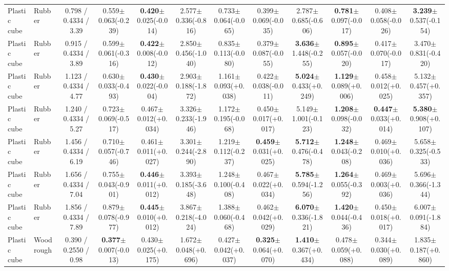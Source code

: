 \begin{table}[t]
{\begin{tabular}{l l c c c c c c c c c c }
        Plastic cube & Rubber & 0.798 / 0.4334 / 3.39 & 0.559$\pm$0.063(-0.239) & \textbf{0.420}$\pm$0.025(-0.014) & 2.577$\pm$0.336(-0.816) & 0.733$\pm$0.064(-0.065) & 0.399$\pm$0.069(-0.035) & 2.787$\pm$0.685(-0.606) & \textbf{0.781}$\pm$0.097(-0.017) & 0.408$\pm$0.058(-0.026) & \textbf{3.239}$\pm$0.537(-0.154) \\
        Plastic cube & Rubber & 0.915 / 0.4334 / 3.89 & 0.599$\pm$0.061(-0.316) & \textbf{0.422}$\pm$0.008(-0.012) & 2.850$\pm$0.456(-1.040) & 0.835$\pm$0.113(-0.080) & 0.379$\pm$0.087(-0.055) & \textbf{3.636}$\pm$1.448(-0.255) & \textbf{0.895}$\pm$0.057(-0.020) & 0.417$\pm$0.070(-0.017) & 3.470$\pm$0.831(-0.420) \\
        Plastic cube & Rubber & 1.123 / 0.4334 / 4.77 & 0.630$\pm$0.033(-0.493) & \textbf{0.430}$\pm$0.022(-0.004) & 2.903$\pm$0.188(-1.872) & 1.161$\pm$0.093(+0.038) & 0.422$\pm$0.038(-0.011) & \textbf{5.024}$\pm$0.433(+0.249) & \textbf{1.129}$\pm$0.089(+0.006) & 0.458$\pm$0.012(+0.025) & 5.132$\pm$0.457(+0.357) \\
        Plastic cube & Rubber & 1.240 / 0.4334 / 5.27 & 0.723$\pm$0.069(-0.517) & 0.467$\pm$0.012(+0.034) & 3.326$\pm$0.233(-1.946) & 1.172$\pm$0.195(-0.068) & 0.450$\pm$0.017(+0.017) & 5.149$\pm$1.001(-0.123) & \textbf{1.208}$\pm$0.098(-0.032) & \textbf{0.447}$\pm$0.033(+0.014) & \textbf{5.380}$\pm$0.908(+0.107) \\
        Plastic cube & Rubber & 1.456 / 0.4334 / 6.19 & 0.710$\pm$0.057(-0.746) & 0.461$\pm$0.011(+0.027) & 3.301$\pm$0.244(-2.890) & 1.219$\pm$0.112(-0.237) & \textbf{0.459}$\pm$0.031(+0.025) & \textbf{5.712}$\pm$0.476(-0.478) & \textbf{1.248}$\pm$0.043(-0.208) & 0.469$\pm$0.010(+0.036) & 5.658$\pm$0.325(-0.533) \\
        Plastic cube & Rubber & 1.656 / 0.4334 / 7.04 & 0.755$\pm$0.043(-0.901) & \textbf{0.446}$\pm$0.011(+0.012) & 3.393$\pm$0.185(-3.648) & 1.248$\pm$0.100(-0.408) & 0.467$\pm$0.022(+0.034) & \textbf{5.785}$\pm$0.594(-1.256) & \textbf{1.264}$\pm$0.055(-0.392) & 0.469$\pm$0.003(+0.036) & 5.696$\pm$0.366(-1.344) \\
        Plastic cube & Rubber & 1.856 / 0.4334 / 7.89 & 0.879$\pm$0.078(-0.977) & \textbf{0.445}$\pm$0.010(+0.012) & 3.867$\pm$0.218(-4.024) & 1.388$\pm$0.060(-0.468) & 0.462$\pm$0.042(+0.029) & \textbf{6.070}$\pm$0.336(-1.821) & \textbf{1.420}$\pm$0.044(-0.436) & 0.450$\pm$0.018(+0.017) & 6.007$\pm$0.091(-1.884) \\
        Plastic cube & Wood rough & 0.390 / 0.2550 / 0.98 & \textbf{0.377}$\pm$0.007(-0.013) & 0.430$\pm$0.025(+0.175) & 1.672$\pm$0.048(+0.696) & 0.427$\pm$0.042(+0.037) & \textbf{0.325}$\pm$0.064(+0.070) & \textbf{1.410}$\pm$0.367(+0.434) & 0.478$\pm$0.059(+0.088) & 0.344$\pm$0.030(+0.089) & 1.835$\pm$0.187(+0.860) \\

\end{tabular}}
\end{table}
